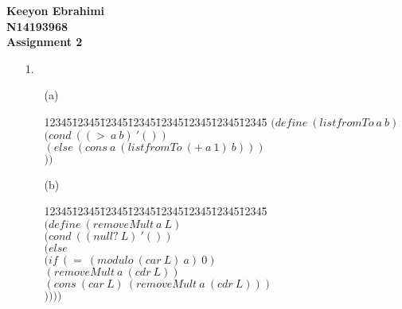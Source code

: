 \documentclass[11pt]{article}
\newenvironment{code}{\begin{tabbing}
12345\=12345\=12345\=12345\=12345\=12345\=12345\=12345\= \kill }
{\end{tabbing}}
\begin{document}
\textbf{Keeyon Ebrahimi}\\
\textbf{N14193968}\\
\textbf{Assignment 2}\\

\begin{enumerate}
\item[1. ]

\begin{enumerate}
\item[(a)] 
\begin{code}
$(define\ (listfromTo\ a\ b)$\\
\> $(cond\ ((>\ a\ b)\ '())$\\
\> \> $(else\ (cons\ a\ (listfromTo\ (+\ a\ 1)\ b)))$\\
\> \> $))$ \\
\end{code}

\item[(b)]

\begin{code}
$(define\ (removeMult\ a\ L)$\\
\> $(cond\ ((null?\ L)\ '())$\\
\> \> $(else\ $\\
\> \> \> $(if\ (=\ (modulo\ (car\ L)\ a)\ 0)$\\
\> \> \> \> $(removeMult\ a\ (cdr\ L))$\\
\> \> \> \> $(cons\ (car\ L)\ (removeMult\ a\ (cdr\ L)))$\\
\> \> \> \> $))))$\\
\end{code}
\end{enumerate}
\end{enumerate}
\end{document}
